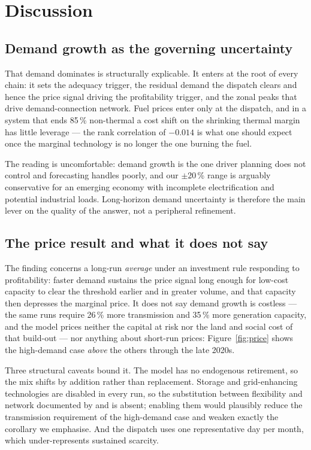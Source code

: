\section{Discussion}
\label{sec:discussion}

\subsection{Demand growth as the governing uncertainty}

That demand dominates is structurally explicable. It enters at the root of every chain:
it sets the adequacy trigger, the residual demand the dispatch clears and hence the
price signal driving the profitability trigger, and the zonal peaks that drive
demand-connection network. Fuel prices enter only at the dispatch, and in a system that
ends 85\,\% non-thermal a cost shift on the shrinking thermal margin has little
leverage --- the rank correlation of $-0.014$ is what one should expect once the
marginal technology is no longer the one burning the fuel.

The reading is uncomfortable: demand growth is the one driver planning does not
control and forecasting handles poorly, and our $\pm$20\,\% range is arguably
conservative for an emerging economy with incomplete electrification and potential
industrial loads. Long-horizon demand uncertainty \citep{alvarez2026} is therefore the
main lever on the quality of the answer, not a peripheral refinement.

\subsection{The price result and what it does not say}

The finding concerns a long-run \emph{average} under an
investment rule responding to profitability: faster demand sustains the price signal
long enough for low-cost capacity to clear the threshold earlier and in greater volume,
and that capacity then depresses the marginal price. It does not say demand growth is
costless --- the same runs require 26\,\% more transmission and 35\,\% more generation
capacity, and the model prices neither the capital at risk nor the land and social cost
of that build-out --- nor anything about short-run prices: Figure~\ref{fig:price} shows
the high-demand case \emph{above} the others through the late 2020s.

Three structural caveats bound it. The model has no endogenous retirement, so the mix
shifts by addition rather than replacement. Storage and grid-enhancing technologies
are disabled in every run, so the substitution between flexibility and network
documented by \citet{sousa2024} and \citet{sadeghian2026} is absent; enabling them
would plausibly reduce the transmission requirement of the high-demand case and weaken
exactly the corollary we emphasise. And the dispatch uses one representative day per
month, which under-represents sustained scarcity.

